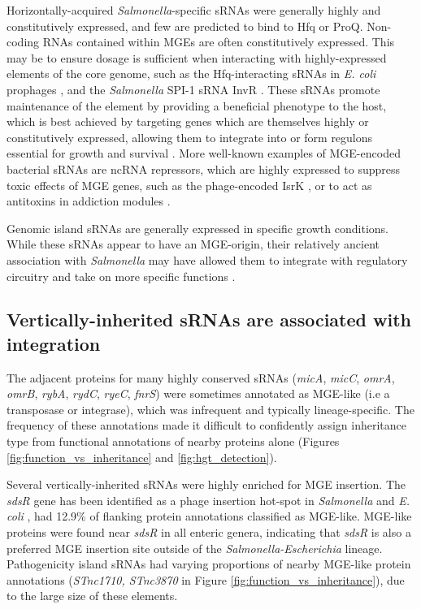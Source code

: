 Horizontally-acquired \textit{Salmonella}-specific sRNAs were generally highly and constitutively expressed, and few are predicted to bind to Hfq or ProQ. Non-coding RNAs contained within MGEs are often constitutively expressed. This may be to ensure dosage is sufficient when interacting with highly-expressed elements of the core genome, such as the Hfq-interacting sRNAs in \textit{E. coli} prophages \citep{Tree2014-xz}, and the \textit{Salmonella} SPI-1 sRNA InvR \citep{Pfeiffer2007-yb}. These sRNAs promote maintenance of the element by providing a beneficial phenotype to the host, which is best achieved by targeting genes which are themselves highly or constitutively expressed, allowing them to integrate into or form regulons essential for growth and survival \citep{Frohlich2016-pr,Pfeiffer2007-yb}. More well-known examples of MGE-encoded bacterial sRNAs are ncRNA repressors, which are highly expressed to suppress toxic effects of MGE genes, such as the phage-encoded IsrK \citep{Hershko-Shalev2016-kv}, or to act as antitoxins in addiction modules \citep{Lobato-Marquez2015-ah}. 

Genomic island sRNAs are generally expressed in specific growth conditions. While these sRNAs appear to have an MGE-origin, their relatively ancient association with \textit{Salmonella} may have allowed them to integrate with regulatory circuitry and take on more specific functions \citep{Frohlich2016-pr}.

\subsection{Vertically-inherited sRNAs are associated with integration}

The adjacent proteins for many highly conserved sRNAs (\textit{micA}, \textit{micC}, \textit{omrA}, \textit{omrB}, \textit{rybA}, \textit{rydC}, \textit{ryeC}, \textit{fnrS}) were sometimes annotated as MGE-like (i.e a transposase or integrase), which was infrequent and typically lineage-specific. The frequency of these annotations made it difficult to confidently assign inheritance type from functional annotations of nearby proteins alone (Figures \ref{fig:function_vs_inheritance} and \ref{fig:hgt_detection}).

Several vertically-inherited sRNAs were highly enriched for MGE insertion. The \textit{sdsR} gene has been identified as a phage insertion hot-spot in \textit{Salmonella} and \textit{E. coli} \citep{Balbontin2008-vv}, had 12.9\% of flanking protein annotations classified as MGE-like. MGE-like proteins were found near \textit{sdsR} in all enteric genera, indicating that \textit{sdsR} is also a preferred MGE insertion site outside of the \textit{Salmonella-Escherichia} lineage. Pathogenicity island sRNAs had varying proportions of nearby MGE-like protein annotations (\textit{STnc1710, STnc3870} in Figure \ref{fig:function_vs_inheritance}), due to the large size of these elements. 

